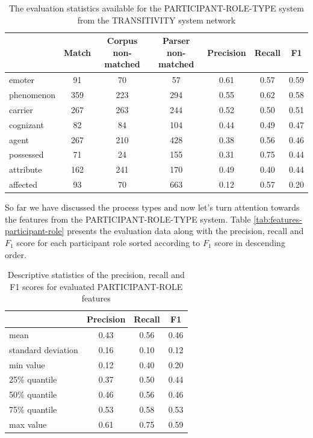     \begin{table}[!b]
    \centering
        \begin{tabulary}{0.8\textwidth}{@{}lCCCccc@{}}
        \toprule
        & Match & Corpus non-matched & Parser non-matched & Precision & Recall & F1 \\ 
        \midrule
        emoter & 91 & 70 & 57 & 0.61 & 0.57 & 0.59 \\
        phenomenon & 359 & 223 & 294 & 0.55 & 0.62 & 0.58 \\
        carrier & 267 & 263 & 244 & 0.52 & 0.50 & 0.51 \\
        cognizant & 82 & 84 & 104 & 0.44 & 0.49 & 0.47 \\
        agent & 267 & 210 & 428 & 0.38 & 0.56 & 0.46 \\
        possessed & 71 & 24 & 155 & 0.31 & 0.75 & 0.44 \\
        attribute & 162 & 241 & 170 & 0.49 & 0.40 & 0.44 \\
        affected & 93 & 70 & 663 & 0.12 & 0.57 & 0.20 \\
        \bottomrule
        \end{tabulary}
    \caption{The evaluation statistics available for the PARTICIPANT-ROLE-TYPE system from the TRANSITIVITY system network}
    \label{tab:features-participant-role-restricted}
    \end{table}
    
    So far we have discussed the process types and now let's turn attention towards the features from the PARTICIPANT-ROLE-TYPE system. Table \ref{tab:features-participant-role} presents the evaluation data along with the precision, recall and $F_1$ score for each participant role sorted according to $F_1$ score in descending order. 
    
    \begin{table}[!b]
    \centering
    \begin{tabular}{lccc}
        \toprule
        {} & {Precision} & {Recall} & {F1} \\ %
        \midrule
        mean & 0.43 & 0.56 & 0.46 \\
        standard deviation & 0.16 & 0.10 & 0.12 \\
        min value & 0.12 & 0.40 & 0.20 \\
        25\% quantile & 0.37 & 0.50 & 0.44 \\
        50\% quantile & 0.46 & 0.56 & 0.46 \\
        75\% quantile & 0.53 & 0.58 & 0.53 \\
        max value & 0.61 & 0.75 & 0.59 \\
        \bottomrule
    \end{tabular}
    \caption{Descriptive statistics of the precision, recall and F1 scores for evaluated PARTICIPANT-ROLE features}
    \label{tab:features-participant-role-accuracy}
    \end{table}
    
